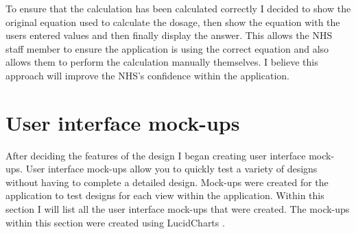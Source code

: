 To ensure that the calculation has been calculated correctly I decided to show the original equation used to calculate the dosage, then show the equation with the users entered values and then finally display the answer. This allows the NHS staff member to ensure the application is using the correct equation and also allows them to perform the calculation manually themselves. I believe this approach will improve the NHS's confidence within the application.

\section{User interface mock-ups}
After deciding the features of the design I began creating user interface mock-ups. User interface mock-ups allow you to quickly test a variety of designs without having to complete a detailed design. Mock-ups were created for the application to test designs for each view within the application. Within this section I will list all the user interface mock-ups that were created. The mock-ups within this section were created using LucidCharts \cite{lucid_charts}.

